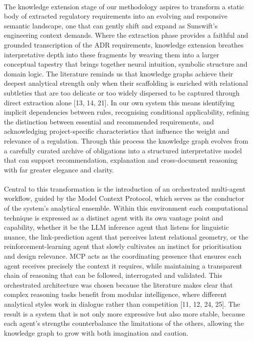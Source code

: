         \paragraph{}
        The knowledge extension stage of our methodology aspires to transform a static body of extracted regulatory requirements into an evolving and responsive semantic landscape, one that can gently shift and expand as Sunswift’s engineering context demands. Where the extraction phase provides a faithful and grounded transcription of the ADR requirements, knowledge extension breathes interpretative depth into these fragments by weaving them into a larger conceptual tapestry that brings together neural intuition, symbolic structure and domain logic. The literature reminds us that knowledge graphs achieve their deepest analytical strength only when their scaffolding is enriched with relational subtleties that are too delicate or too widely dispersed to be captured through direct extraction alone [13, 14, 21]. In our own system this means identifying implicit dependencies between rules, recognising conditional applicability, refining the distinction between essential and recommended requirements, and acknowledging project-specific characteristics that influence the weight and relevance of a regulation. Through this process the knowledge graph evolves from a carefully curated archive of obligations into a structured interpretative model that can support recommendation, explanation and cross-document reasoning with far greater elegance and clarity.

        \paragraph{}
        Central to this transformation is the introduction of an orchestrated multi-agent workflow, guided by the Model Context Protocol, which serves as the conductor of the system’s analytical ensemble. Within this environment each computational technique is expressed as a distinct agent with its own vantage point and capability, whether it be the LLM inference agent that listens for linguistic nuance, the link-prediction agent that perceives latent relational geometry, or the reinforcement-learning agent that slowly cultivates an instinct for prioritisation and design relevance. MCP acts as the coordinating presence that ensures each agent receives precisely the context it requires, while maintaining a transparent chain of reasoning that can be followed, interrogated and validated. This orchestrated architecture was chosen because the literature makes clear that complex reasoning tasks benefit from modular intelligence, where different analytical styles work in dialogue rather than competition [11, 12, 24, 25]. The result is a system that is not only more expressive but also more stable, because each agent’s strengths counterbalance the limitations of the others, allowing the knowledge graph to grow with both imagination and caution.
        
